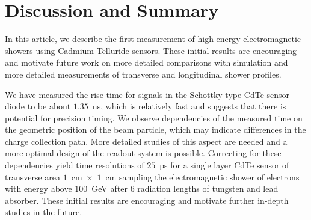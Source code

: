 
\section{Discussion and Summary}
\label{sec:summary} 


In this article, we describe the first measurement of high energy 
electromagnetic showers using Cadmium-Telluride sensors. 
These initial results are encouraging and motivate future work on 
more detailed comparisons with simulation and more detailed 
measurements of transverse and longitudinal shower profiles.



We have measured the rise time for signals in the Schottky type CdTe sensor diode to be about $1.35$~ns, which
is relatively fast and suggests that there is potential for precision timing.
We observe dependencies of the measured time on the geometric position of the
beam particle, which may indicate differences in the charge collection path.
More detailed studies of this aspect are needed and a more optimal design of the 
readout system is possible. Correcting for these dependencies yield time resolutions
of $25$~ps for a single layer CdTe sensor of transverse area $1$~cm~$\times$~$1$~cm
sampling the electromagnetic shower of electrons with energy above $100$~GeV 
after $6$ radiation lengths of tungsten and lead absorber. These initial results are encouraging and motivate 
further in-depth studies in the future.



